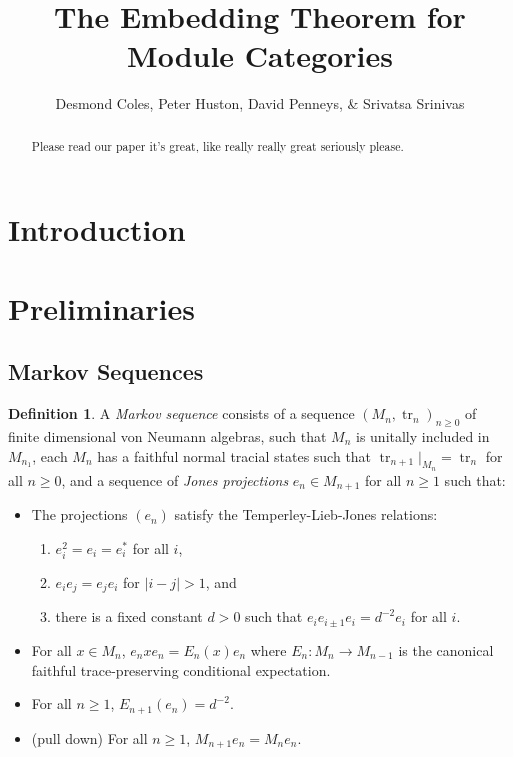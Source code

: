 \documentclass[11pt]{article}
\title{The Embedding Theorem for Module Categories}
\author{Desmond Coles, Peter Huston, David Penneys, \& Srivatsa Srinivas}
\theoremstyle{plain}
\theoremstyle{definition}
\newtheorem{defn}[thm]{Definition}
\DeclareMathOperator{\tr}{tr}
\begin{document}

\maketitle
\begin{abstract}
Please read our paper it's great, like really really great seriously please.
\end{abstract}
\section{Introduction}
\section{Preliminaries}
\subsection{Markov Sequences}


\begin{defn}
A \emph{Markov sequence} consists of a sequence $(M_n, \tr_n)_{n\geq 0}$ of finite dimensional von Neumann algebras, such that $M_n$ is unitally included in $M_{n_1}$, each $M_n$ has a faithful normal tracial states such that $\tr_{n+1}|_{M_n} = \tr_n$ for all $n\geq 0$, and a sequence of \emph{Jones projections} $e_n \in M_{n+1}$ for all $n\geq 1$ such that:
\begin{itemize}
\item
The projections $(e_n)$ satisfy the Temperley-Lieb-Jones relations:
\begin{enumerate}[(1)]
\item
$e_i^2 = e_i = e_i^*$ for all $i$,
\item
$e_i e_j = e_j e_i$ for $|i-j|>1$, and
\item
there is a fixed constant $d>0$ such that $e_{i} e_{i\pm 1} e_i = d^{-2} e_i$ for all $i$.
\end{enumerate}
\item
For all $x\in M_n$, $e_n x e_n = E_n(x)e_n$ where $E_n: M_n \to M_{n-1}$ is the canonical faithful trace-preserving conditional expectation.
\item
For all $n\geq 1$, $E_{n+1}(e_n) = d^{-2}$.
\item
(pull down)
For all $n\geq 1$, $M_{n+1}e_n = M_n e_n$.

\end{itemize}
\end{defn}
\end{document}

